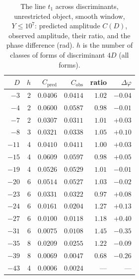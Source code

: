 \documentclass[11pt,a4paper]{article}
\theoremstyle{remark}\newtheorem{remark}[theorem]{Remark}
\begin{document}
\begin{table}[htbp]
\centering\footnotesize
\caption{The line $t_1$ across discriminants, unrestricted object, smooth window, $Y\le10^7$: predicted amplitude
$C(D)$, observed amplitude, their ratio, and the phase difference (rad). $h$ is the number of classes of forms of
discriminant $4D$ (all forms).}\label{tab:dsweep}
\begin{tabular}{@{}rrrrrr@{}}
\toprule
$D$ & $h$ & $C_{\mathrm{pred}}$ & $C_{\mathrm{obs}}$ & ratio & $\Delta\varphi$\\
\midrule
$-3$ & 2 & $0.0406$ & $0.0414$ & $1.02$ & $-0.04$\\
$-4$ & 2 & $0.0600$ & $0.0587$ & $0.98$ & $-0.01$\\
$-7$ & 2 & $0.0307$ & $0.0311$ & $1.01$ & $+0.03$\\
$-8$ & 3 & $0.0321$ & $0.0338$ & $1.05$ & $+0.10$\\
$-11$ & 4 & $0.0410$ & $0.0411$ & $1.00$ & $+0.03$\\
$-15$ & 4 & $0.0609$ & $0.0597$ & $0.98$ & $+0.05$\\
$-19$ & 4 & $0.0526$ & $0.0529$ & $1.01$ & $-0.01$\\
$-20$ & 6 & $0.0514$ & $0.0527$ & $1.03$ & $-0.02$\\
$-23$ & 6 & $0.0331$ & $0.0322$ & $0.97$ & $+0.08$\\
$-24$ & 6 & $0.0161$ & $0.0204$ & $1.27$ & $+0.13$\\
$-27$ & 6 & $0.0100$ & $0.0118$ & $1.18$ & $+0.40$\\
$-31$ & 6 & $0.0075$ & $0.0108$ & $1.45$ & $-0.35$\\
$-35$ & 8 & $0.0209$ & $0.0255$ & $1.22$ & $-0.09$\\
$-39$ & 8 & $0.0069$ & $0.0047$ & $0.68$ & $-0.26$\\
$-43$ & 4 & $0.0006$ & $0.0024$ & --- & ---\\
\bottomrule
\end{tabular}
\end{table}
\end{document}
